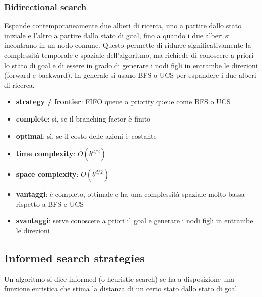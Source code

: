 \subsubsection*{Bidirectional search}
Espande contemporaneamente due alberi di ricerca, uno a partire dallo stato iniziale e l'altro a partire dallo stato di goal,
fino a quando i due alberi si incontrano in un nodo comune. Questo permette di ridurre significativamente la complessità
temporale e spaziale dell'algoritmo, ma richiede di conoscere a priori lo stato di goal e di essere in grado di generare i
nodi figli in entrambe le direzioni (forward e backward). In generale si usano BFS o UCS per espandere i due alberi di ricerca.
\begin{itemize}
	\item \textbf{strategy / frontier}: FIFO queue o priority queue come BFS o UCS
	\item \textbf{complete}: sì, se il branching factor è finito
	\item \textbf{optimal}: sì, se il costo delle azioni è costante
	\item \textbf{time complexity}: \(O(b^{d/2})\)
	\item \textbf{space complexity}: \(O(b^{d/2})\)
	\item \textbf{vantaggi}: è completo, ottimale e ha una complessità spaziale molto bassa rispetto a BFS e UCS
	\item \textbf{svantaggi}: serve conoscere a priori il goal e generare i nodi figli in entrambe le direzioni
\end{itemize}

\subsection{Informed search strategies}
Un algoritmo si dice informed (o heuristic search) se ha a disposizione una funzione euristica che stima la distanza di un
certo stato dallo stato di goal.

